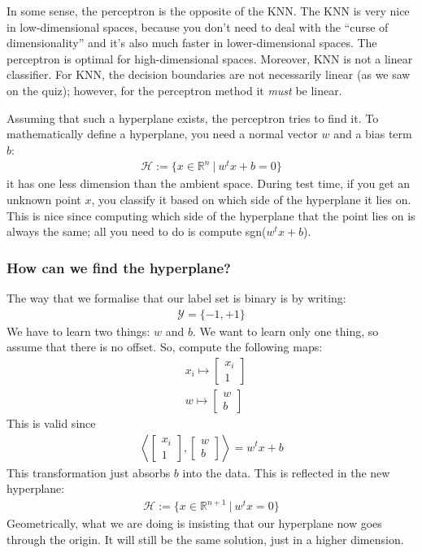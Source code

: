 \documentclass[11pt]{scrartcl}
\newcommand{\R}[0]{\mathbb{R}}
\theoremstyle{definition}
\theoremstyle{remark}
\begin{document}
In some sense, the perceptron is the opposite of the KNN. The KNN is very nice in low-dimensional spaces, because you don't need to deal with the ``curse of dimensionality'' and it's also much faster in lower-dimensional spaces. The perceptron is optimal for high-dimensional spaces. Moreover, KNN is not a linear classifier. For KNN, the decision boundaries are not necessarily linear (as we saw on the quiz); however, for the perceptron method it \emph{must} be linear. 

Assuming that such a hyperplane exists, the perceptron tries to find it. To mathematically define a hyperplane, you need a normal vector $w$ and a bias term $b$: 
\begin{align}
	\mathcal{H}:= \{ x \in \R^n\ |\ w^t x + b = 0 \} 	
\end{align}
it has one less dimension than the ambient space. During test time, if you get an unknown point $x$, you classify it based on which side of the hyperplane it lies on. This is nice since  computing which side of the hyperplane that the point lies on is always the same; all you need to do is compute sgn($w^t x + b$). 

\subsubsection{How can we find the hyperplane?}

The way that we formalise that our label set is binary is by writing: 
\begin{align*}
	\mathcal{Y} = \{ -1, +1 \} 	
\end{align*}
We have to learn two things: $w$ and $b$. We want to learn only one thing, so assume that there is no offset. So, compute the following maps: 
\begin{align*}
	& x_i \mapsto \begin{bmatrix}
		x_i \\
		1 
	\end{bmatrix}	\\
	& w \mapsto \begin{bmatrix}
		w \\
		b
	\end{bmatrix} 
\end{align*}
This is valid since 
\begin{align*}
 	\left\langle 	\begin{bmatrix}
		x_i \\
		1 
	\end{bmatrix} , \begin{bmatrix}
		w \\
		b
	\end{bmatrix} \right\rangle = w^tx + b 
\end{align*}
This transformation just absorbs $b$ into the data. This is reflected in the new hyperplane: 
\begin{align*}
	\mathcal{H} := \{ x \in \R^{n+1}\ |\ w^tx = 0 \}
\end{align*}
Geometrically, what we are doing is insisting that our hyperplane now goes through the origin. It will still be the same solution, just in a higher dimension. 
\end{document}

